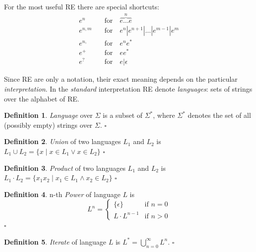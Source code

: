 \documentclass{article}
\newcommand{\Xin}{\!\in\!}
\newcommand{\Xeq}{\!=\!}
\theoremstyle{definition}
\newtheorem{Xdef}{Definition}
\begin{document}
\begin{multicols}{2}
For the most useful RE there are special shortcuts:
    \begin{align*}
        e^n     &\quad\text{for}\quad \overbrace{e \dots e}^{n} \\[-0.5em]
        e^{n,m} &\quad\text{for}\quad e^n | e^{n+1} | \dots | e^{m-1} | e^m \\[-0.5em]
        e^{n,}  &\quad\text{for}\quad e^n e^* \\[-0.5em]
        e^+     &\quad\text{for}\quad ee^* \\[-0.5em]
        e^?     &\quad\text{for}\quad e | \epsilon
    \end{align*}

Since RE are only a notation, their exact meaning depends on the particular \emph{interpretation}.
In the \emph{standard} interpretation RE denote \emph{languages}: sets of strings over the alphabet of RE.

    \begin{Xdef}
    \emph{Language} over $\Sigma$ is a subset of $\Sigma^*$,
    where $\Sigma^*$ denotes the set of all (possibly empty) strings over $\Sigma$.
    $\square$
    \end{Xdef}

    \begin{Xdef}\label{langunion}
    \emph{Union} of two languages $L_1$ and $L_2$ is
    $L_1 \cup L_2 = \{ x \mid x \Xin L_1 \vee x \Xin L_2 \}$
    $\square$
    \end{Xdef}

    \begin{Xdef}\label{langproduct}
    \emph{Product} of two languages $L_1$ and $L_2$ is
    $L_1 \cdot L_2 = \{ x_1 x_2 \mid x_1 \Xin L_1 \wedge x_2 \Xin L_2 \}$
    $\square$
    \end{Xdef}

    \begin{Xdef}\label{langiterate}
    n-th \emph{Power} of language $L$ is
    $$L^n = \begin{cases}
            \{ \epsilon \} & \text{if } n \Xeq 0 \\[-0.5em]
            L \cdot L^{n - 1} & \text{if } n\!>\!0
        \end{cases}$$
    $\square$
    \end{Xdef}

    \begin{Xdef}\label{langiterate}
    \emph{Iterate} of language $L$ is
    $L^* = \bigcup\limits_{n = 0}^\infty L^n$.
    $\square$
    \end{Xdef}


\end{multicols}
\end{document}
